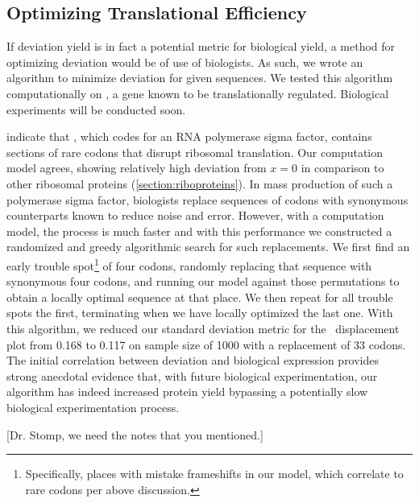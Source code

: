 \documentclass[12pt]{article}
\numberwithin{equation}{section}
\begin{document}
\subsection{Optimizing Translational Efficiency}

If deviation yield is in fact a potential metric for biological yield,
a method for optimizing deviation would be of use of biologists.  As such,
we wrote an algorithm to minimize deviation for given sequences.
We tested this algorithm computationally on \rpoS, a gene known to
be translationally regulated.  Biological experiments will be
conducted soon.


\citet{rpoS:process} indicate that \rpoS, which codes for an RNA
polymerase sigma factor, contains sections of rare codons that disrupt
ribosomal translation. Our computation model agrees, showing
relatively high deviation from $x = 0$ in comparison to other
ribosomal proteins (\autoref{section:riboproteins}). In mass
production of such a polymerase sigma factor, biologists replace
sequences of codons with synonymous counterparts known to reduce noise
and error. However, with a computation model, the process is much
faster and with this performance we constructed a randomized and greedy
algorithmic search for such replacements. We first find an
early trouble spot\footnote{Specifically, places with mistake
  frameshifts in our model, which correlate to rare codons per above
  discussion.} of four codons, randomly replacing that sequence with
synonymous four codons, and running our model against those
permutations to obtain a locally optimal sequence at that place. We
then repeat for all trouble spots the first, terminating when we have
locally optimized the last one. With this algorithm, we reduced our
standard deviation metric for the \rpoS\ displacement plot from 0.168
to 0.117 on sample size of 1000 with a replacement of 33 codons. The
initial correlation between deviation and biological expression
provides strong anecdotal evidence that, with future biological
experimentation, our algorithm has indeed increased protein yield
bypassing a potentially slow biological experimentation process.

[Dr. Stomp, we need the notes that you mentioned.]
\end{document}
